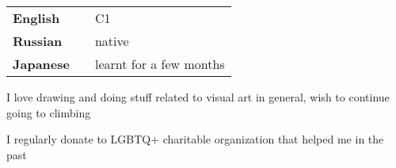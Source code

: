 \documentclass[9pt]{template/developercv} %
\begin{document}
\begin{minipage}[t]{0.3\textwidth}
	\vspace{-\baselineskip}


	\begin{tabular}{lp{}l}
		\textbf{English} & & C1\\
		\textbf{Russian} & & native\\
		\textbf{Japanese} & & learnt for a few months
	\end{tabular}
\end{minipage}
\hfill
\begin{minipage}[t]{0.3\textwidth}
	\vspace{-\baselineskip}


	I love drawing and doing stuff related to visual art in general, wish to continue going to climbing
\end{minipage}
\hfill
\begin{minipage}[t]{0.3\textwidth}
	\vspace{-\baselineskip}


	I regularly donate to LGBTQ+ charitable organization that helped me in the past
\end{minipage}
\end{document}
